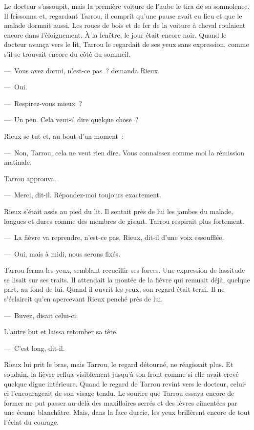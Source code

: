 \documentclass[french,twoside]{book} %
\begin{document}
Le docteur s’assoupit, mais la première voiture de l’aube le tira de sa somnolence. Il frissonna et, regardant Tarrou, il comprit qu’une pause avait eu lieu et que le malade dormait aussi. Les roues de bois et de fer de la voiture à cheval roulaient encore dans l’éloignement. À la fenêtre, le jour était encore noir. Quand le docteur avança vers le lit, Tarrou le regardait de ses yeux sans expression, comme s’il se trouvait encore du côté du sommeil.\par
— Vous avez dormi, n’est-ce pas ? demanda Rieux.\par
— Oui.\par
— Respirez-vous mieux ?\par
— Un peu. Cela veut-il dire quelque chose ?\par
Rieux se tut et, au bout d’un moment :\par
— Non, Tarrou, cela ne veut rien dire. Vous connaissez comme moi la rémission matinale.\par
Tarrou approuva.\par
— Merci, dit-il. Répondez-moi toujours exactement.\par
Rieux s’était assis au pied du lit. Il sentait près de lui les jambes du malade, longues et dures comme des membres de gisant. Tarrou respirait plus fortement.\par
— La fièvre va reprendre, n’est-ce pas, Rieux, dit-il d’une voix essoufflée.\par
— Oui, mais à midi, nous serons fixés.\par
Tarrou ferma les yeux, semblant recueillir ses forces. Une expression de lassitude se lisait sur ses traits. Il attendait la montée de la fièvre qui remuait déjà, quelque part, au fond de lui. Quand il ouvrit les yeux, son regard était terni. Il ne s’éclaircit qu’en apercevant Rieux penché près de lui.\par
— Buvez, disait celui-ci.\par
L’autre but et laissa retomber sa tête.\par
— C’est long, dit-il.\par
Rieux lui prit le bras, mais Tarrou, le regard détourné, ne réagissait plus. Et soudain, la fièvre reflua visiblement jusqu’à son front comme si elle avait crevé quelque digue intérieure. Quand le regard de Tarrou revint vers le docteur, celui-ci l’encourageait de son visage tendu. Le sourire que Tarrou essaya encore de former ne put passer au-delà des maxillaires serrés et des lèvres cimentées par une écume blanchâtre. Mais, dans la face durcie, les yeux brillèrent encore de tout l’éclat du courage.\par
\end{document}
